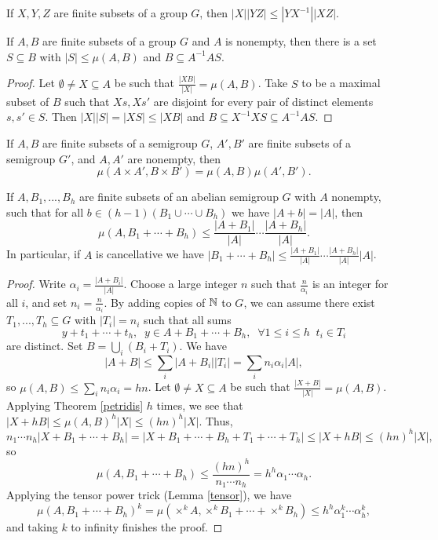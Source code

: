 \begin{thm}\label{triangle} If $X,Y,Z$ are finite subsets of a group $G$, then $|X||YZ| \le |YX^{-1}||XZ|$.
\end{thm}

\begin{thm} If $A,B$ are finite subsets of a group $G$ and $A$ is nonempty, then there is a set $S\subseteq B$ with $|S| \le \mu(A,B)$ and $B \subseteq A^{-1}AS$.
\end{thm}
\begin{proof} Let $\emptyset \ne X\subseteq A$ be such that $\frac{|XB|}{|X|} = \mu(A,B)$. Take $S$ to be a maximal subset of $B$ such that $Xs, Xs'$ are disjoint for every pair of distinct elements $s,s' \in S$. Then $|X||S| = |XS| \le |XB|$ and $B \subseteq X^{-1}XS \subseteq A^{-1}AS$.
\end{proof}

\begin{lem}\label{tensor} If $A,B$ are finite subsets of a semigroup $G$, $A',B'$ are finite subsets of a semigroup $G'$, and $A,A'$ are nonempty, then
\[
\mu(A\times A',B\times B') = \mu(A,B)\mu(A',B').
\]
\end{lem}

\begin{thm}\label{sumset} If $A,B_1, ..., B_h$ are finite subsets of an abelian semigroup $G$ with $A$ nonempty, such that for all $b \in (h-1)(B_1\cup\cdots\cup B_h)$ we have $|A+b| = |A|$, then
\[
\mu(A,B_1 + \cdots + B_h) \le \frac{|A+B_1|}{|A|}\cdots\frac{|A+B_h|}{|A|}.
\]
In particular, if $A$ is cancellative we have $|B_1 + \cdots + B_h| \le \frac{|A+B_1|}{|A|}\cdots\frac{|A+B_h|}{|A|}|A|$.
\end{thm}
\begin{proof} Write $\alpha_i = \frac{|A+B_i|}{|A|}$. Choose a large integer $n$ such that $\frac{n}{\alpha_i}$ is an integer for all $i$, and set $n_i = \frac{n}{\alpha_i}$. By adding copies of $\mathbb{N}$ to $G$, we can assume there exist $T_1, ..., T_h\subseteq G$ with $|T_i| = n_i$ such that all sums
\[
y + t_1 + \cdots + t_h,\;\; y \in A+B_1+\cdots +B_h,\;\; \forall 1\le i\le h\;\; t_i\in T_i
\]
are distinct. Set $B = \bigcup_i (B_i+T_i)$. We have
\[
|A+B| \le \sum_i |A+B_i||T_i| = \sum_i n_i\alpha_i |A|,
\]
so $\mu(A,B) \le \sum_i n_i\alpha_i = hn$. Let $\emptyset \ne X \subseteq A$ be such that $\frac{|X+B|}{|X|} = \mu(A,B)$. Applying Theorem \ref{petridis} $h$ times, we see that $|X+hB| \le \mu(A,B)^h|X| \le (hn)^h|X|$. Thus,
\[
n_1\cdots n_h|X+B_1+\cdots +B_h| = |X+B_1+\cdots +B_h+T_1+\cdots +T_h| \le |X+hB| \le (hn)^h|X|,
\]
so
\[
\mu(A,B_1+\cdots +B_h) \le \frac{(hn)^h}{n_1\cdots n_h} = h^h\alpha_1\cdots \alpha_h.
\]
Applying the tensor power trick (Lemma \ref{tensor}), we have
\[
\mu(A,B_1+\cdots +B_h)^k = \mu(\times^kA,\times^kB_1+\cdots +\times^kB_h) \le h^h\alpha_1^k\cdots \alpha_h^k,
\]
and taking $k$ to infinity finishes the proof.
\end{proof}

